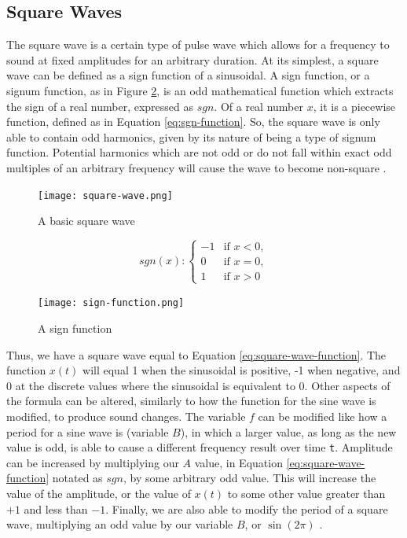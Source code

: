 \subsection{Square Waves}

The square wave is a certain type of pulse wave which allows for a frequency to sound at fixed amplitudes for an arbitrary duration. At its simplest, a square wave can be defined as a sign function of a sinusoidal. A sign function, or a signum function, as in Figure \ref{fig:sign-function}, is an odd mathematical function which extracts the sign of a real number, expressed as $sgn$. Of a real number $x$, it is a piecewise function, defined as in Equation \ref{eq:sgn-function}. So, the square wave is only able to contain odd harmonics, given by its nature of being a type of signum function. Potential harmonics which are not odd or do not fall within exact odd multiples of an arbitrary frequency will cause the wave to become non-square \cite{Case_2007}.

\begin{figure}[ht]
  \centering
  \texttt{[image: square-wave.png]}
  \caption{A basic square wave}
  \label{fig:square-wave}
\end{figure}

\begin{equation}
	sgn (x): \begin{cases}
		-1 & \textrm{if } x < 0, \\
		0 & \textrm{if } x = 0, \\
		1 & \textrm{if } x > 0
	\end{cases}
	\label{eq:sgn-function}
\end{equation}

\begin{figure}[h]
  \centering
  \texttt{[image: sign-function.png]}
  \caption{A sign function}
  \label{fig:sign-function}
\end{figure}

Thus, we have a square wave equal to Equation \ref{eq:square-wave-function}. The function $x(t)$ will equal 1 when the sinusoidal is positive, -1 when negative, and 0 at the discrete values where the sinusoidal is equivalent to 0. Other aspects of the formula can be altered, similarly to how the function for the sine wave is modified, to produce sound changes. The variable $f$ can be modified like how a period for a sine wave is (variable $B$), in which a larger value, as long as the new value is odd, is able to cause a different frequency result over time \texttt{t}. Amplitude can be increased by multiplying our $A$ value, in Equation \ref{eq:square-wave-function} notated as $sgn$, by some arbitrary odd value. This will increase the value of the amplitude, or the value of $x(t)$ to some other value greater than $+1$ and less than $-1$. Finally, we are also able to modify the period of a square wave, multiplying an odd value by our variable $B$, or $\sin(2\pi)$ \cite{Case_2007}.

